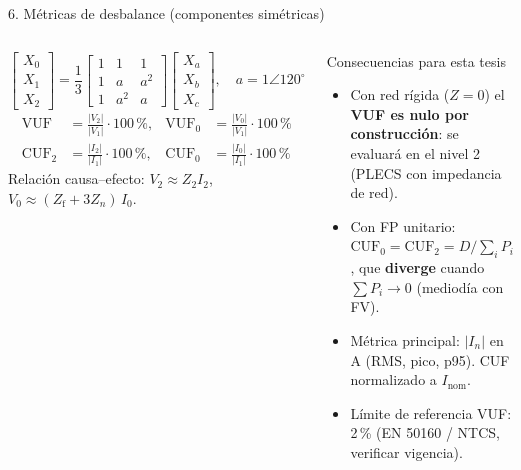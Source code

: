 \documentclass[aspectratio=169,11pt]{beamer}
\begin{document}
\begin{frame}{6. Métricas de desbalance (componentes simétricas)}
  \begin{columns}[T]
    \begin{equation*}
      \begin{bmatrix}X_0\\X_1\\X_2\end{bmatrix}=\frac13
      \begin{bmatrix}1&1&1\\1&a&a^2\\1&a^2&a\end{bmatrix}
      \begin{bmatrix}X_a\\X_b\\X_c\end{bmatrix},\quad a=1\angle120^\circ
    \end{equation*}
    \begin{align}
      \mathrm{VUF} &= \frac{|V_2|}{|V_1|}\cdot100\,\%, & \mathrm{VUF}_0 &= \frac{|V_0|}{|V_1|}\cdot100\,\% \\
      \mathrm{CUF}_2 &= \frac{|I_2|}{|I_1|}\cdot100\,\%, & \mathrm{CUF}_0 &= \frac{|I_0|}{|I_1|}\cdot100\,\%
    \end{align}
    Relación causa--efecto: \;$V_2\approx Z_2 I_2$, \;\; $V_0\approx (Z_{\mathrm{f}}+3Z_n)\,I_0$.
    \begin{alertblock}{Consecuencias para esta tesis}
      \footnotesize
      \begin{itemize}
        \item Con red rígida ($Z=0$) el \textbf{VUF es nulo por construcción}: se evaluará en el nivel 2 (PLECS con impedancia de red).
        \item Con FP unitario: $\mathrm{CUF}_0=\mathrm{CUF}_2=D/\sum_i P_i$, que \textbf{diverge} cuando $\sum P_i\to0$ (mediodía con FV).
        \item Métrica principal: $|I_n|$ en A (RMS, pico, p95). CUF normalizado a $I_{\mathrm{nom}}$.
        \item Límite de referencia VUF: 2\,\% (EN 50160 / NTCS, verificar vigencia).
      \end{itemize}
    \end{alertblock}
  \end{columns}
\end{frame}

\end{document}
